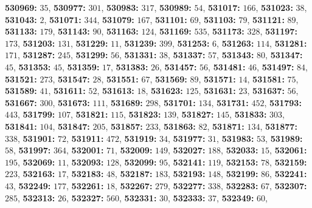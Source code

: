 \textsf{\bfseries 530969:} $35$, \textsf{\bfseries 530977:} $301$, \textsf{\bfseries 530983:} $317$, \textsf{\bfseries 530989:} $54$, \textsf{\bfseries 531017:} $166$, \textsf{\bfseries 531023:} $38$, \textsf{\bfseries 531043:} $2$, \textsf{\bfseries 531071:} $344$, \textsf{\bfseries 531079:} $167$, \textsf{\bfseries 531101:} $69$, \textsf{\bfseries 531103:} $79$, \textsf{\bfseries 531121:} $89$, \textsf{\bfseries 531133:} $179$, \textsf{\bfseries 531143:} $90$, \textsf{\bfseries 531163:} $124$, \textsf{\bfseries 531169:} $535$, \textsf{\bfseries 531173:} $328$, \textsf{\bfseries 531197:} $173$, \textsf{\bfseries 531203:} $131$, \textsf{\bfseries 531229:} $11$, \textsf{\bfseries 531239:} $399$, \textsf{\bfseries 531253:} $6$, \textsf{\bfseries 531263:} $114$, \textsf{\bfseries 531281:} $171$, \textsf{\bfseries 531287:} $245$, \textsf{\bfseries 531299:} $56$, \textsf{\bfseries 531331:} $38$, \textsf{\bfseries 531337:} $57$, \textsf{\bfseries 531343:} $80$, \textsf{\bfseries 531347:} $45$, \textsf{\bfseries 531353:} $45$, \textsf{\bfseries 531359:} $17$, \textsf{\bfseries 531383:} $26$, \textsf{\bfseries 531457:} $56$, \textsf{\bfseries 531481:} $46$, \textsf{\bfseries 531497:} $84$, \textsf{\bfseries 531521:} $273$, \textsf{\bfseries 531547:} $28$, \textsf{\bfseries 531551:} $67$, \textsf{\bfseries 531569:} $89$, \textsf{\bfseries 531571:} $14$, \textsf{\bfseries 531581:} $75$, \textsf{\bfseries 531589:} $41$, \textsf{\bfseries 531611:} $52$, \textsf{\bfseries 531613:} $18$, \textsf{\bfseries 531623:} $125$, \textsf{\bfseries 531631:} $23$, \textsf{\bfseries 531637:} $56$, \textsf{\bfseries 531667:} $300$, \textsf{\bfseries 531673:} $111$, \textsf{\bfseries 531689:} $298$, \textsf{\bfseries 531701:} $134$, \textsf{\bfseries 531731:} $452$, \textsf{\bfseries 531793:} $443$, \textsf{\bfseries 531799:} $107$, \textsf{\bfseries 531821:} $115$, \textsf{\bfseries 531823:} $139$, \textsf{\bfseries 531827:} $145$, \textsf{\bfseries 531833:} $303$, \textsf{\bfseries 531841:} $104$, \textsf{\bfseries 531847:} $205$, \textsf{\bfseries 531857:} $233$, \textsf{\bfseries 531863:} $82$, \textsf{\bfseries 531871:} $134$, \textsf{\bfseries 531877:} $338$, \textsf{\bfseries 531901:} $72$, \textsf{\bfseries 531911:} $472$, \textsf{\bfseries 531919:} $34$, \textsf{\bfseries 531977:} $31$, \textsf{\bfseries 531983:} $53$, \textsf{\bfseries 531989:} $58$, \textsf{\bfseries 531997:} $364$, \textsf{\bfseries 532001:} $71$, \textsf{\bfseries 532009:} $149$, \textsf{\bfseries 532027:} $188$, \textsf{\bfseries 532033:} $15$, \textsf{\bfseries 532061:} $195$, \textsf{\bfseries 532069:} $11$, \textsf{\bfseries 532093:} $128$, \textsf{\bfseries 532099:} $95$, \textsf{\bfseries 532141:} $119$, \textsf{\bfseries 532153:} $78$, \textsf{\bfseries 532159:} $223$, \textsf{\bfseries 532163:} $17$, \textsf{\bfseries 532183:} $48$, \textsf{\bfseries 532187:} $183$, \textsf{\bfseries 532193:} $148$, \textsf{\bfseries 532199:} $86$, \textsf{\bfseries 532241:} $43$, \textsf{\bfseries 532249:} $177$, \textsf{\bfseries 532261:} $18$, \textsf{\bfseries 532267:} $279$, \textsf{\bfseries 532277:} $338$, \textsf{\bfseries 532283:} $67$, \textsf{\bfseries 532307:} $285$, \textsf{\bfseries 532313:} $26$, \textsf{\bfseries 532327:} $560$, \textsf{\bfseries 532331:} $30$, \textsf{\bfseries 532333:} $37$, \textsf{\bfseries 532349:} $60$, 
